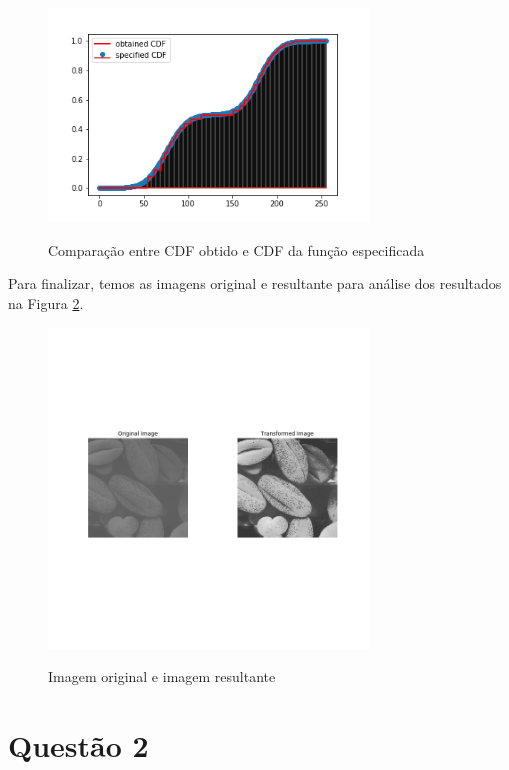 \documentclass{article}
\begin{document}
\begin{figure}[H]
	\label{fig:cdf}
	\begin{minipage}[b]{1.0\linewidth}
		\centering
		\centerline{\includegraphics[width=8.5cm]{Figures/transformed_cdf}}
		\centerline{Comparação entre CDF obtido e CDF da função especificada}\medskip
	\end{minipage}
\end{figure}

Para finalizar, temos as imagens original e resultante para análise dos resultados na Figura \ref{fig:img1}.

\begin{figure}[H]
	\label{fig:img1}
	\begin{minipage}[b]{1.0\linewidth}
		\centering
		\centerline{\includegraphics[width=8.5cm]{Figures/images1}}
		\centerline{Imagem original e imagem resultante}\medskip
	\end{minipage}
\end{figure}

\section{Questão 2}
\end{document}

